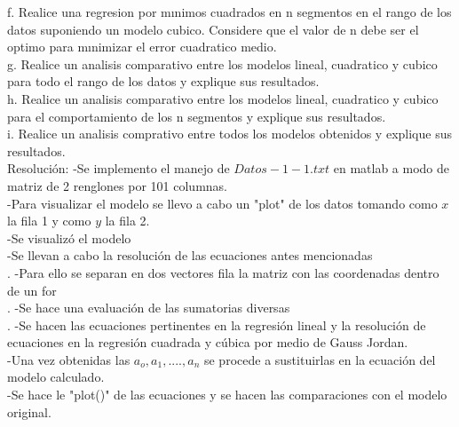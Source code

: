 \documentclass[12pt,letterpaper]{article}
\begin{document}
f. Realice una regresion por mınimos cuadrados en n segmentos en el rango
de los datos suponiendo un modelo cubico. Considere que el valor de n
debe ser el optimo para mınimizar el error cuadratico medio.\\
g. Realice un analisis comparativo entre los modelos lineal, cuadratico y cubico para todo el rango de los datos y explique sus resultados.\\
h. Realice un analisis comparativo entre los modelos lineal, cuadratico y cubico para el comportamiento de los n segmentos y explique sus resultados.\\
i. Realice un analisis comprativo entre todos los modelos obtenidos y explique sus resultados.\\

Resolución:
-Se implemento el manejo de $Datos-1-1. txt$ en matlab a modo de matriz de 2 renglones por 101 columnas.\\
-Para visualizar el modelo se llevo a cabo un "plot" de los datos tomando como $x$ la fila 1 y como $y$ la fila 2.\\
-Se visualizó el modelo\\
-Se llevan a cabo la resolución de las ecuaciones antes mencionadas \\
. \quad -Para ello se separan en dos vectores fila la matriz con las coordenadas dentro de un for\\
. \quad -Se hace una evaluación de las sumatorias diversas\\
. \quad -Se hacen las ecuaciones pertinentes en la regresión lineal y la resolución de ecuaciones en la regresión cuadrada y cúbica por medio de Gauss Jordan.\\
-Una vez obtenidas las $a_o,a_1,....,a_n$ se procede a sustituirlas en la ecuación del modelo calculado.\\
-Se hace le "plot()" de las ecuaciones y se hacen las comparaciones con el modelo original.\\
\end{document}
